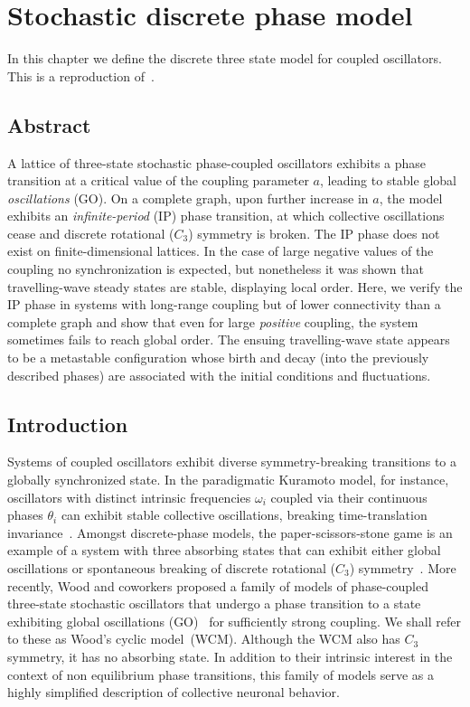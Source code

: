 \chapter{\label{chap:article} Stochastic discrete phase model}

In this chapter we define the discrete three state model for coupled oscillators. This is a reproduction
of~\cite{rodrigues2020synchronization}.

\section{Abstract}

A lattice of three-state stochastic phase-coupled oscillators exhibits a phase transition at a critical value of the coupling parameter
$a$, leading to stable global \textit{oscillations} (GO). On a complete graph, upon further increase in $a$, the model exhibits an
\textit{infinite-period} (IP) phase transition, at which collective oscillations cease and discrete rotational ($C_3$) symmetry is
broken. The IP phase does not exist on finite-dimensional lattices.  In the case of large negative values of the coupling no
synchronization is expected, but nonetheless it was shown that travelling-wave steady states are stable, displaying local order. Here,
we verify the IP phase in systems with long-range coupling but of lower connectivity than a complete graph and show that even for large
\textit{ positive} coupling, the system sometimes fails to reach global order. The ensuing travelling-wave state appears to be a
metastable configuration whose birth and decay (into the previously described phases) are associated with the initial conditions and
fluctuations.

\section{Introduction}

Systems of coupled oscillators exhibit diverse symmetry-breaking transitions to a globally synchronized state. In the paradigmatic
Kuramoto model, for instance, oscillators with distinct intrinsic frequencies $\omega_i$ coupled via their continuous phases $\theta_i$
can exhibit stable collective oscillations, breaking time-translation
invariance~\cite{Kuramoto84,Strogatz93,Strogatz00,StrogatzSync,Pikovsky01}.  Amongst discrete-phase models, the paper-scissors-stone
game is an example of a system with three absorbing states that can exhibit either global oscillations or spontaneous breaking of
discrete rotational ($C_3$) symmetry~\cite{Tainaka88,Tainaka89,Tainaka91,Itoh94,Tainaka94}. More recently, Wood and coworkers proposed
a family of models of phase-coupled three-state stochastic oscillators that undergo a phase transition to a state exhibiting global
oscillations (GO)~\cite{Wood06a,Wood06b,Wood07a,Wood07b} for sufficiently strong coupling.  We shall refer to these as Wood's cyclic
model~(WCM). Although the WCM also has $C_3$ symmetry, it has no absorbing state.  In addition to their intrinsic interest in the
context of non equilibrium phase transitions, this family of models serve as a highly simplified description of collective neuronal
behavior.


